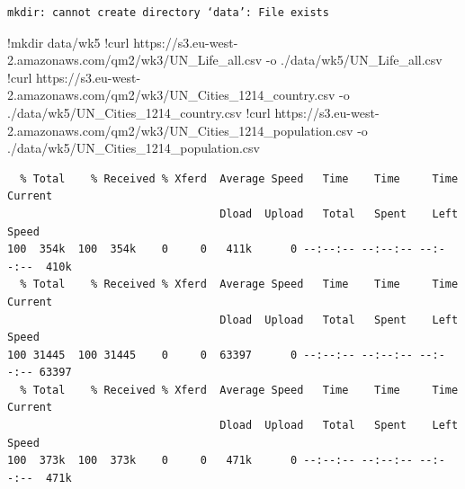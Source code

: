\documentclass[
  letterpaper,
  DIV=11,
  numbers=noendperiod]{scrreprt}
\newenvironment{Shaded}{\begin{snugshade}}{\end{snugshade}}
\newcommand{\ErrorTok}[1]{\textcolor[rgb]{0.68,0.00,0.00}{#1}}
\newcommand{\FloatTok}[1]{\textcolor[rgb]{0.68,0.00,0.00}{#1}}
\newcommand{\NormalTok}[1]{\textcolor[rgb]{0.00,0.23,0.31}{#1}}
\newcommand{\OperatorTok}[1]{\textcolor[rgb]{0.37,0.37,0.37}{#1}}
\begin{document}
\begin{verbatim}
mkdir: cannot create directory ‘data’: File exists
\end{verbatim}

\begin{Shaded}
\begin{Highlighting}[]
\OperatorTok{!}\NormalTok{mkdir data}\OperatorTok{/}\NormalTok{wk5}
\OperatorTok{!}\NormalTok{curl https:}\OperatorTok{//}\NormalTok{s3.eu}\OperatorTok{{-}}\NormalTok{west}\OperatorTok{{-}}\FloatTok{2.}\ErrorTok{amazonaws}\NormalTok{.com}\OperatorTok{/}\NormalTok{qm2}\OperatorTok{/}\NormalTok{wk3}\OperatorTok{/}\NormalTok{UN\_Life\_all.csv }\OperatorTok{{-}}\NormalTok{o .}\OperatorTok{/}\NormalTok{data}\OperatorTok{/}\NormalTok{wk5}\OperatorTok{/}\NormalTok{UN\_Life\_all.csv}
\OperatorTok{!}\NormalTok{curl https:}\OperatorTok{//}\NormalTok{s3.eu}\OperatorTok{{-}}\NormalTok{west}\OperatorTok{{-}}\FloatTok{2.}\ErrorTok{amazonaws}\NormalTok{.com}\OperatorTok{/}\NormalTok{qm2}\OperatorTok{/}\NormalTok{wk3}\OperatorTok{/}\NormalTok{UN\_Cities\_1214\_country.csv }\OperatorTok{{-}}\NormalTok{o .}\OperatorTok{/}\NormalTok{data}\OperatorTok{/}\NormalTok{wk5}\OperatorTok{/}\NormalTok{UN\_Cities\_1214\_country.csv}
\OperatorTok{!}\NormalTok{curl https:}\OperatorTok{//}\NormalTok{s3.eu}\OperatorTok{{-}}\NormalTok{west}\OperatorTok{{-}}\FloatTok{2.}\ErrorTok{amazonaws}\NormalTok{.com}\OperatorTok{/}\NormalTok{qm2}\OperatorTok{/}\NormalTok{wk3}\OperatorTok{/}\NormalTok{UN\_Cities\_1214\_population.csv }\OperatorTok{{-}}\NormalTok{o .}\OperatorTok{/}\NormalTok{data}\OperatorTok{/}\NormalTok{wk5}\OperatorTok{/}\NormalTok{UN\_Cities\_1214\_population.csv}
\end{Highlighting}
\end{Shaded}

\begin{verbatim}
  % Total    % Received % Xferd  Average Speed   Time    Time     Time  Current
                                 Dload  Upload   Total   Spent    Left  Speed
100  354k  100  354k    0     0   411k      0 --:--:-- --:--:-- --:--:--  410k
  % Total    % Received % Xferd  Average Speed   Time    Time     Time  Current
                                 Dload  Upload   Total   Spent    Left  Speed
100 31445  100 31445    0     0  63397      0 --:--:-- --:--:-- --:--:-- 63397
  % Total    % Received % Xferd  Average Speed   Time    Time     Time  Current
                                 Dload  Upload   Total   Spent    Left  Speed
100  373k  100  373k    0     0   471k      0 --:--:-- --:--:-- --:--:--  471k
\end{verbatim}
\end{document}
